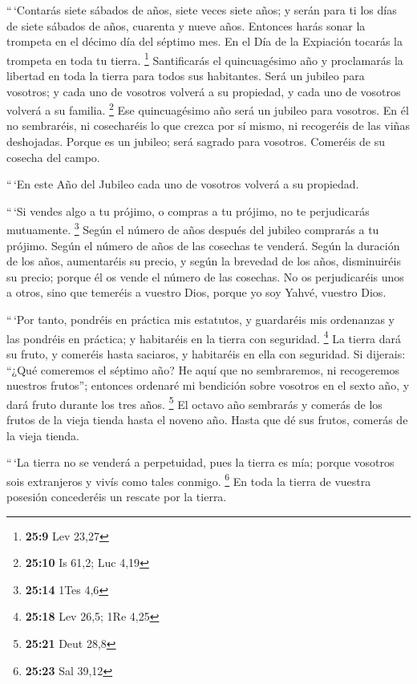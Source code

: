  ``\,`Contarás siete sábados de años, siete veces siete
años; y serán para ti los días de siete sábados de años, cuarenta y
nueve años.  Entonces harás sonar la trompeta en el décimo
día del séptimo mes. En el Día de la Expiación tocarás la trompeta en
toda tu tierra. \footnote{\textbf{25:9} Lev 23,27} 
Santificarás el quincuagésimo año y proclamarás la libertad en toda la
tierra para todos sus habitantes. Será un jubileo para vosotros; y cada
uno de vosotros volverá a su propiedad, y cada uno de vosotros volverá a
su familia. \footnote{\textbf{25:10} Is 61,2; Luc 4,19} 
Ese quincuagésimo año será un jubileo para vosotros. En él no
sembraréis, ni cosecharéis lo que crezca por sí mismo, ni recogeréis de
las viñas deshojadas.  Porque es un jubileo; será sagrado
para vosotros. Comeréis de su cosecha del campo.

 ``\,`En este Año del Jubileo cada uno de vosotros
volverá a su propiedad.

 ``\,`Si vendes algo a tu prójimo, o compras a tu
prójimo, no te perjudicarás mutuamente. \footnote{\textbf{25:14} 1Tes
  4,6}  Según el número de años después del jubileo
comprarás a tu prójimo. Según el número de años de las cosechas te
venderá.  Según la duración de los años, aumentaréis su
precio, y según la brevedad de los años, disminuiréis su precio; porque
él os vende el número de las cosechas.  No os
perjudicaréis unos a otros, sino que temeréis a vuestro Dios, porque yo
soy Yahvé, vuestro Dios.

 ``\,`Por tanto, pondréis en práctica mis estatutos, y
guardaréis mis ordenanzas y las pondréis en práctica; y habitaréis en la
tierra con seguridad. \footnote{\textbf{25:18} Lev 26,5; 1Re 4,25}
 La tierra dará su fruto, y comeréis hasta saciaros, y
habitaréis en ella con seguridad.  Si dijerais: ``¿Qué
comeremos el séptimo año? He aquí que no sembraremos, ni recogeremos
nuestros frutos'';  entonces ordenaré mi bendición sobre
vosotros en el sexto año, y dará fruto durante los tres años.
\footnote{\textbf{25:21} Deut 28,8}  El octavo año
sembrarás y comerás de los frutos de la vieja tienda hasta el noveno
año. Hasta que dé sus frutos, comerás de la vieja tienda.

 ``\,`La tierra no se venderá a perpetuidad, pues la
tierra es mía; porque vosotros sois extranjeros y vivís como tales
conmigo. \footnote{\textbf{25:23} Sal 39,12}  En toda la
tierra de vuestra posesión concederéis un rescate por la tierra.

